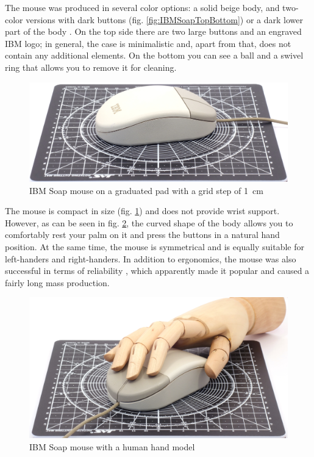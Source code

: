 \documentclass[11pt, a4paper]{article}
\begin{document}
The mouse was produced in several color options: a solid beige body, and two-color versions with dark buttons (fig. \ref{fig:IBMSoapTopBottom}) or a dark lower part of the body \cite{hugold}. On the top side there are two large buttons and an engraved IBM logo; in general, the case is minimalistic and, apart from that, does not contain any additional elements. On the bottom you can see a ball and a swivel ring that allows you to remove it for cleaning.

\begin{figure}[h]
    \centering
    \includegraphics[scale=0.34]{1992_ibm_soap_mouse/size_30.jpg}
    \caption{IBM Soap mouse on a graduated pad with a grid step of 1~cm}
    \label{fig:IBMSoapSize}
\end{figure}

The mouse is compact in size (fig. \ref{fig:IBMSoapSize}) and does not provide wrist support. However, as can be seen in fig. \ref{fig:IBMSoapHand}, the curved shape of the body allows you to comfortably rest your palm on it and press the buttons in a natural hand position. At the same time, the mouse is symmetrical and is equally suitable for left-handers and right-handers. In addition to ergonomics, the mouse was also successful in terms of reliability \cite{usage}, which apparently made it popular and caused a fairly long mass production.

\begin{figure}[h]
    \centering
    \includegraphics[scale=0.34]{1992_ibm_soap_mouse/hand_30.jpg}
    \caption{IBM Soap mouse with a human hand model}
    \label{fig:IBMSoapHand}
\end{figure}
\end{document}
